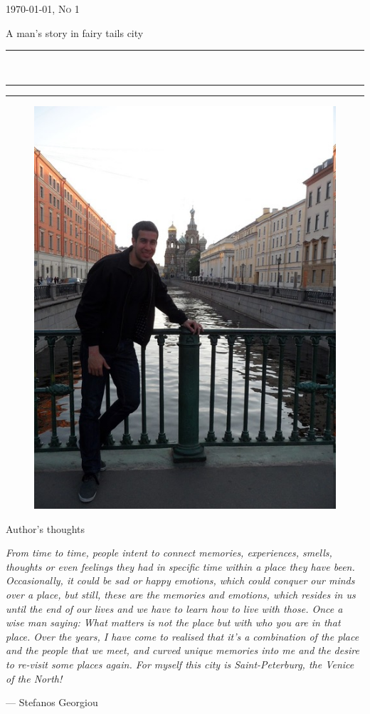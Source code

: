 \documentclass[10pt,a4paper]{article} %
\newcommand{\HorRule}[1]{\noindent\rule{\linewidth}{#1}} %
\newcommand{\SepRule}{\noindent	%
\begin{center}
\rule{250pt}{1pt} %
\end{center}
}
\newcommand{\NewsletterName}[1]{ %
\begin{center}
\Huge \usefont{T1}{fvs}{b}{n} %
#1
\end{center}	
\par \normalsize \normalfont}
\newcommand{\JournalIssue}[1]{ %
\hfill \textsc{\mydate \today, No #1} %
\par \normalsize \normalfont}
\newcommand{\NewsItem}[1]{ %
\usefont{T1}{fvs}{n}{n} %
\vspace{24pt}\large #1\vspace{3pt} %
\par \normalsize \normalfont}
\begin{document}
\JournalIssue{1} %

\NewsletterName{A man's story in fairy tails city} %

\noindent\HorRule{3pt} \\[-0.75\baselineskip] %
\HorRule{1pt} %


\vspace{0.5cm}
\SepRule
\vspace{-0.5cm}

\begin{center}
\begin{minipage}[h]{0.75\linewidth}
\begin{figure}
\includegraphics[width=0.38 \textwidth]{media/front_picture.jpg}
\\
\end{figure}
	
\NewsItem{Author's thoughts} %
\vspace{3pt} %
\textit{
From time to time, people intent to connect memories, experiences, smells, 
thoughts or even feelings they had in specific time within a place they have been. 
Occasionally, it could be sad or happy emotions, which could conquer our minds over a place, 
but still, these are the memories and emotions, 
which resides in us until the end of our lives and we have to learn how to 
live with those. 
Once a wise man saying: 
\textit{What matters is not the place but with who you are in that place}. 
Over the years, I have come to realised that it's a combination of the place and 
the people that we meet, and curved unique memories into me and the desire to 
re-visit some places again. 
For myself this city is Saint-Peterburg, the Venice of the North!
}
\par\hfill --- Stefanos Georgiou
\end{minipage}
\end{center}
\end{document}
